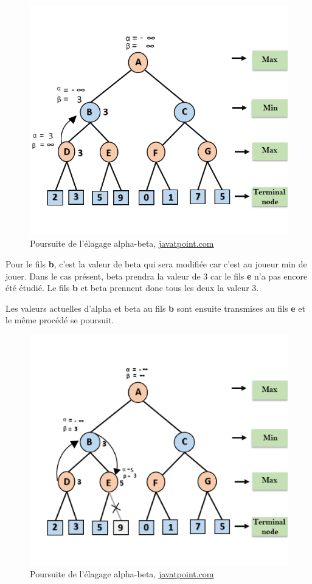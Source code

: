 \huge\documentclass{article}
\begin{document}
\begin{figure}[!h]
\centering
\includegraphics[scale=0.6]{img/alpha-beta-pruning-step3.png}
\caption{Poursuite de l'élagage alpha-beta,
\href{https://www.javatpoint.com/ai-alpha-beta-pruning}{javatpoint.com}}
\end{figure}

Pour le fils \textbf{b}, c'est la valeur de beta qui sera modifiée car c'est au joueur min de jouer. Dans le cas présent, beta prendra la valeur de 3 car le fils \textbf{e} n'a pas encore été étudié. Le fils \textbf{b} et beta prennent donc tous les deux la valeur 3.

Les valeurs actuelles d'alpha et beta au fils \textbf{b} sont ensuite transmises au fils \textbf{e} et le même procédé se poursuit.

\begin{figure}[!h]
\centering
\includegraphics[scale=0.7]{img/alpha-beta-pruning-step4.png}
\caption{Poursuite de l'élagage alpha-beta,
\href{https://www.javatpoint.com/ai-alpha-beta-pruning}{javatpoint.com}}
\end{figure}
\end{document}
